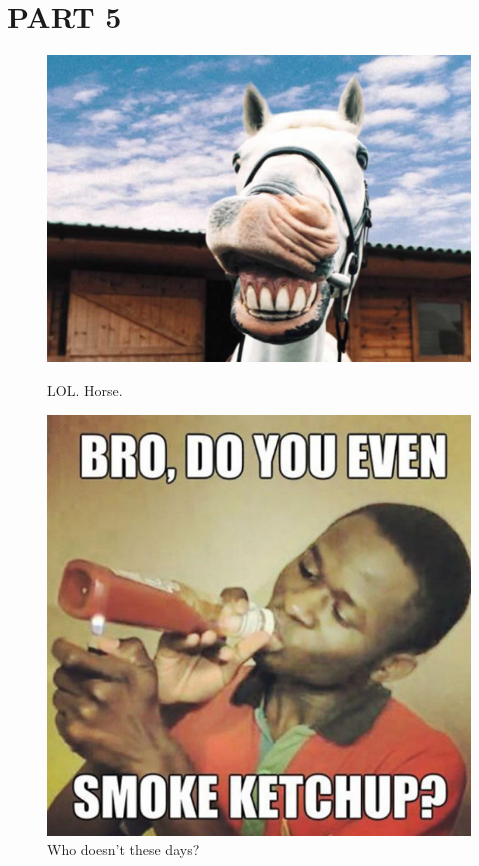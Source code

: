\documentclass[12pt]{article}
\begin{document}
\section{PART 5}

\begin{figure}[H]
  \centering
    \begin{minipage}[t]{.45\textwidth}
      \centering
        \includegraphics[width = \linewidth]{funny-horse.jpg}  
        \caption{LOL. Horse.}
    \label{fig:horse}
    \end{minipage}
    \quad
    \begin{minipage}[t]{.45\textwidth}
      \centering
        \includegraphics[width = \linewidth]{ketchup.jpg}
        \caption{Who doesn't these days?}
        \label{fig:ketchup}
    \end{minipage}
\end{figure}
\end{document}
